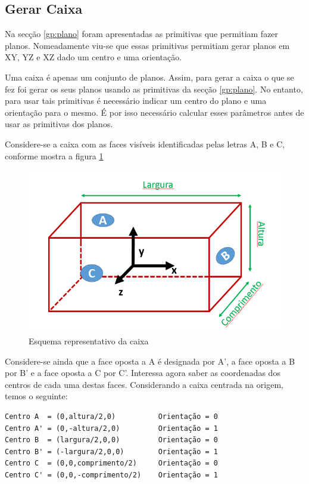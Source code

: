 \subsection{Gerar Caixa}


Na secção \ref{gp:plano} foram apresentadas as primitivas que permitiam fazer planos. Nomeadamente viu-se que essas primitivas permitiam gerar planos em XY, YZ e XZ dado um centro e uma orientação.

Uma caixa é apenas um conjunto de planos. Assim, para gerar a caixa o que se fez foi gerar os seus planos usando as primitivas da secção \ref{gp:plano}. No entanto, para usar tais primitivas é necessário indicar um centro do plano e uma orientação para o mesmo. É por isso necessário calcular esses parâmetros antes de usar as primitivas dos planos.

Considere-se a caixa com as faces visíveis identificadas pelas letras A, B e C, conforme mostra a figura \ref{p1:fig:p3_Caixa}

\begin{figure}[htpb]
	\centering
	\includegraphics[scale=0.5]{imagens/p3_Caixa.png}
	\caption{Esquema representativo da caixa}
	\label{p1:fig:p3_Caixa}
\end{figure}

Considere-se ainda que a face oposta a A é designada por A', a face oposta a B por B' e a face oposta a C por C'.
Interessa agora saber as coordenadas dos centros de cada uma destas faces. Considerando a caixa centrada na origem, temos o seguinte:

\begin{Verbatim}
Centro A  = (0,altura/2,0)          Orientação = 0
Centro A' = (0,-altura/2,0)         Orientação = 1
Centro B  = (largura/2,0,0)         Orientação = 0
Centro B' = (-largura/2,0,0)        Orientação = 1
Centro C  = (0,0,comprimento/2)     Orientação = 0
Centro C' = (0,0,-comprimento/2)    Orientação = 1
\end{Verbatim}

